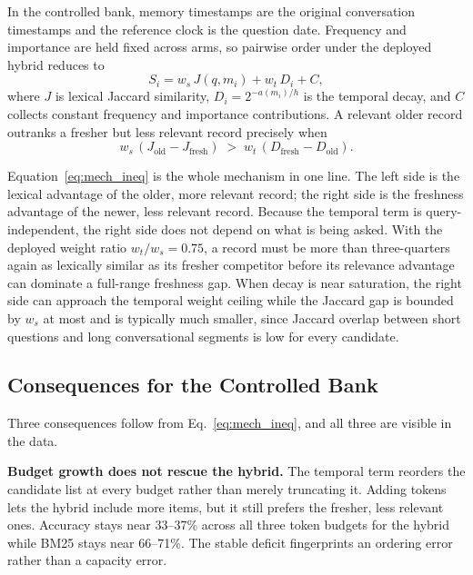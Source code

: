 In the controlled bank, memory timestamps are the original conversation timestamps and the reference clock is the question date. Frequency and importance are held fixed across arms, so pairwise order under the deployed hybrid reduces to
\begin{equation}
  S_i = w_s\,J(q,m_i) + w_t\,D_i + C,
  \label{eq:mech_score}
\end{equation}
where $J$ is lexical Jaccard similarity, $D_i=2^{-a(m_i)/h}$ is the temporal decay, and $C$ collects constant frequency and importance contributions. A relevant older record outranks a fresher but less relevant record precisely when
\begin{equation}
  w_s\,(J_{\mathrm{old}} - J_{\mathrm{fresh}})
  \;>\; w_t\,(D_{\mathrm{fresh}} - D_{\mathrm{old}}).
  \label{eq:mech_ineq}
\end{equation}

Equation~\ref{eq:mech_ineq} is the whole mechanism in one line. The left side is the lexical advantage of the older, more relevant record; the right side is the freshness advantage of the newer, less relevant record. Because the temporal term is query-independent, the right side does not depend on what is being asked. With the deployed weight ratio $w_t/w_s = 0.75$, a record must be more than three-quarters again as lexically similar as its fresher competitor before its relevance advantage can dominate a full-range freshness gap. When decay is near saturation, the right side can approach the temporal weight ceiling while the Jaccard gap is bounded by $w_s$ at most and is typically much smaller, since Jaccard overlap between short questions and long conversational segments is low for every candidate.

\subsection{Consequences for the Controlled Bank}

\label{sec:mech_consequences}

Three consequences follow from Eq.~\ref{eq:mech_ineq}, and all three are visible in the data.

\textbf{Budget growth does not rescue the hybrid.} The temporal term reorders the candidate list at every budget rather than merely truncating it. Adding tokens lets the hybrid include more items, but it still prefers the fresher, less relevant ones. Accuracy stays near 33--37\% across all three token budgets for the hybrid while BM25 stays near 66--71\%. The stable deficit fingerprints an ordering error rather than a capacity error.

